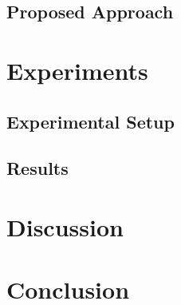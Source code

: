 \documentclass[12pt]{article}
\begin{document}
\subsection{Proposed Approach}

\section{Experiments}
\label{sec:experiments}


\subsection{Experimental Setup}

\subsection{Results}

\section{Discussion}
\label{sec:discussion}


\section{Conclusion}
\label{sec:conclusion}




\end{document}
